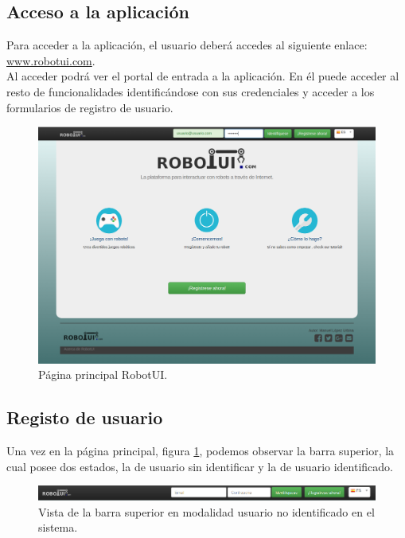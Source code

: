 \subsection{ Acceso a la aplicación }
\label{sec:acceso-aplicacion}

Para acceder a la aplicación, el usuario deberá accedes al siguiente enlace: \url{www.robotui.com}. \\

Al acceder podrá ver el portal de entrada a la aplicación. En él puede acceder al resto de funcionalidades identificándose con sus credenciales y acceder a los formularios de registro
de usuario.\\

\begin{figure}[H]
  \begin{center}
    \includegraphics[scale=0.3]{imagenes/manual-usuario/pagina-principal.png}
  \end{center}
  \caption{Página principal RobotUI.}
  \label{website:pagina-principal}
\end{figure}

\subsection{ Registo de usuario }
\label{sec:creacion-usuario}

Una vez en la página principal, figura \ref{website:pagina-principal}, podemos observar la barra superior, la cual posee dos estados, la de usuario sin identificar y la de usuario identificado.

\begin{figure}[H]
  \begin{center}
    \includegraphics[scale=0.5]{imagenes/manual-usuario/barra-menu1.png}
  \end{center}
  \caption{Vista de la barra superior en modalidad usuario no identificado en el sistema.}
  \label{website:barra-inicial}
\end{figure}

